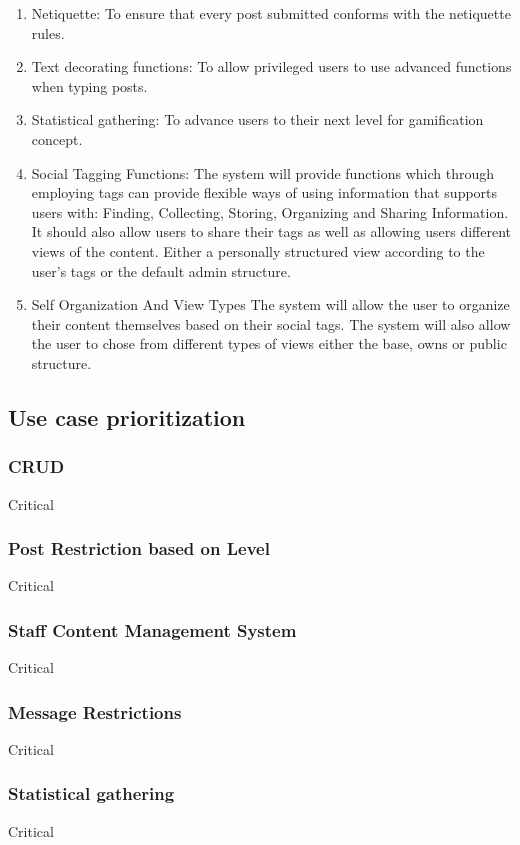 \documentclass[hidelinks, 12pt, oneside]{article}
\begin{document}
\begin{enumerate}
\item{Netiquette}: To ensure that every post submitted conforms with the netiquette rules.

\item{Text decorating functions}: To allow privileged users to use advanced functions when typing posts.

\item{Statistical gathering}: To advance users to their next level for gamification concept.

\item{Social Tagging Functions}: The system will provide functions which through employing tags can provide flexible ways of using information that supports users with: Finding, Collecting, Storing, Organizing and Sharing Information. It should also allow users to share their tags as well as allowing users different views of the content. Either a personally structured view according to the user's tags or the default admin structure.

\item{Self Organization And View Types} The system will allow the user to organize their content themselves based on their social tags. The system will also allow the user to chose from different types of views either the base, owns or public structure.
 
\end{enumerate}

\subsection{Use case prioritization}
\subsubsection{CRUD}
Critical
\subsubsection{Post Restriction based on Level}
Critical
\subsubsection{Staff Content Management System}
Critical
\subsubsection{Message Restrictions}
Critical
\subsubsection{Statistical gathering}
Critical
\end{document}
